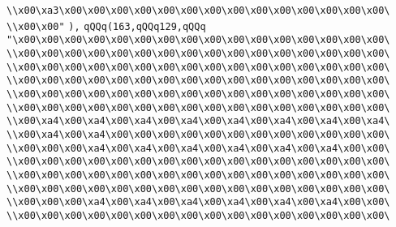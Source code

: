 \verb|\\x00\xa3\x00\x00\x00\x00\x00\x00\x00\x00\x00\x00\x00\x00\x00\x00\|\newline
\verb|\\x00\x00"|\newline
\verb|),|\newline
\verb|qQQq(163,qQQq129,qQQq|\newline
\verb|"\x00\x00\x00\x00\x00\x00\x00\x00\x00\x00\x00\x00\x00\x00\x00\x00\|\newline
\verb|\\x00\x00\x00\x00\x00\x00\x00\x00\x00\x00\x00\x00\x00\x00\x00\x00\|\newline
\verb|\\x00\x00\x00\x00\x00\x00\x00\x00\x00\x00\x00\x00\x00\x00\x00\x00\|\newline
\verb|\\x00\x00\x00\x00\x00\x00\x00\x00\x00\x00\x00\x00\x00\x00\x00\x00\|\newline
\verb|\\x00\x00\x00\x00\x00\x00\x00\x00\x00\x00\x00\x00\x00\x00\x00\x00\|\newline
\verb|\\x00\x00\x00\x00\x00\x00\x00\x00\x00\x00\x00\x00\x00\x00\x00\x00\|\newline
\verb|\\x00\xa4\x00\xa4\x00\xa4\x00\xa4\x00\xa4\x00\xa4\x00\xa4\x00\xa4\|\newline
\verb|\\x00\xa4\x00\xa4\x00\x00\x00\x00\x00\x00\x00\x00\x00\x00\x00\x00\|\newline
\verb|\\x00\x00\x00\xa4\x00\xa4\x00\xa4\x00\xa4\x00\xa4\x00\xa4\x00\x00\|\newline
\verb|\\x00\x00\x00\x00\x00\x00\x00\x00\x00\x00\x00\x00\x00\x00\x00\x00\|\newline
\verb|\\x00\x00\x00\x00\x00\x00\x00\x00\x00\x00\x00\x00\x00\x00\x00\x00\|\newline
\verb|\\x00\x00\x00\x00\x00\x00\x00\x00\x00\x00\x00\x00\x00\x00\x00\x00\|\newline
\verb|\\x00\x00\x00\xa4\x00\xa4\x00\xa4\x00\xa4\x00\xa4\x00\xa4\x00\x00\|\newline
\verb|\\x00\x00\x00\x00\x00\x00\x00\x00\x00\x00\x00\x00\x00\x00\x00\x00\|\newline
